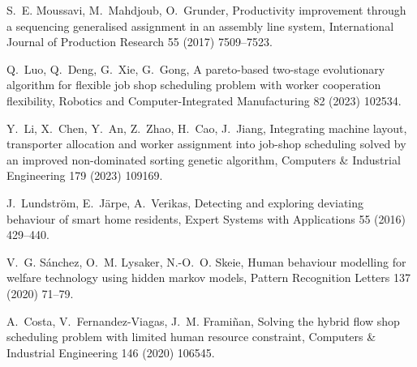 \documentclass[review,12pt, 3p, times]{elsarticle}
\begin{document}
\begin{thebibliography}{10}
	S.~E. Moussavi, M.~Mahdjoub, O.~Grunder, Productivity improvement through a
	sequencing generalised assignment in an assembly line system, International
	Journal of Production Research 55 (2017) 7509--7523.
	
	Q.~Luo, Q.~Deng, G.~Xie, G.~Gong, A pareto-based two-stage evolutionary
	algorithm for flexible job shop scheduling problem with worker cooperation
	flexibility, Robotics and Computer-Integrated Manufacturing 82 (2023) 102534.
	
	Y.~Li, X.~Chen, Y.~An, Z.~Zhao, H.~Cao, J.~Jiang, Integrating machine layout,
	transporter allocation and worker assignment into job-shop scheduling solved
	by an improved non-dominated sorting genetic algorithm, Computers \&
	Industrial Engineering 179 (2023) 109169.
	
	J.~Lundström, E.~Järpe, A.~Verikas, Detecting and exploring deviating
	behaviour of smart home residents, Expert Systems with Applications 55 (2016)
	429--440.
	
	V.~G. Sánchez, O.~M. Lysaker, N.-O.~O. Skeie, Human behaviour modelling for
	welfare technology using hidden markov models, Pattern Recognition Letters
	137 (2020) 71--79.
	
	A.~Costa, V.~Fernandez-Viagas, J.~M. Frami{\~n}an, Solving the hybrid flow shop
	scheduling problem with limited human resource constraint, Computers \&
	Industrial Engineering 146 (2020) 106545.
	
\end{thebibliography}



% 
\end{document}

